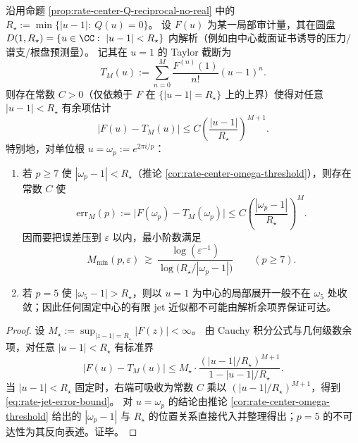 \begin{proposition}\label{prop:rate-center-Rstar-jet-complexity}
沿用命题 \ref{prop:rate-center-Q-reciprocal-no-real} 中的
\(
R_\star:=\min\{|u-1|:\ Q(u)=0\}
\)。
设 \(F(u)\) 为某一局部审计量，其在圆盘
\(
D(1,R_\star)=\{u\in\CC:\ |u-1|<R_\star\}
\)
内解析（例如由中心截面证书诱导的压力/谱支/根盘预测量）。
记其在 \(u=1\) 的 Taylor 截断为
\[
T_M(u):=\sum_{n=0}^{M}\frac{F^{(n)}(1)}{n!}(u-1)^n.
\]
则存在常数 \(C>0\)（仅依赖于 \(F\) 在 \(\{|u-1|=R_\star\}\) 上的上界）使得对任意 \(|u-1|<R_\star\) 有余项估计
\begin{equation}\label{eq:rate-jet-error-bound}
\boxed{\;
\bigl|F(u)-T_M(u)\bigr|
\le
C\left(\frac{|u-1|}{R_\star}\right)^{M+1}. \;}
\end{equation}
特别地，对单位根 \(u=\omega_p:=e^{2\pi i/p}\)：
\begin{enumerate}
  \item 若 \(p\ge 7\) 使 \(|\omega_p-1|<R_\star\)（推论 \ref{cor:rate-center-omega-threshold}），则存在常数 \(C\) 使
  \[
  \mathrm{err}_M(p):=\bigl|F(\omega_p)-T_M(\omega_p)\bigr|
  \le
  C\left(\frac{|\omega_p-1|}{R_\star}\right)^{M}.
  \]
  因而要把误差压到 \(\varepsilon\) 以内，最小阶数满足
  \[
  M_{\min}(p,\varepsilon)\ \gtrsim\ \frac{\log(\varepsilon^{-1})}{\log\!\bigl(R_\star/|\omega_p-1|\bigr)}\qquad(p\ge 7).
  \]
  \item 若 \(p=5\) 使 \(|\omega_5-1|>R_\star\)，则以 \(u=1\) 为中心的局部展开一般不在 \(\omega_5\) 处收敛；因此任何固定中心的有限 jet 近似都不可能由解析余项界保证可达。
\end{enumerate}
\end{proposition}
\begin{proof}
设 \(M_\star:=\sup_{|z-1|=R_\star}|F(z)|<\infty\)。
由 Cauchy 积分公式与几何级数余项，对任意 \(|u-1|<R_\star\) 有标准界
\[
\bigl|F(u)-T_M(u)\bigr|
\le
M_\star\cdot \frac{(|u-1|/R_\star)^{M+1}}{1-|u-1|/R_\star}.
\]
当 \(|u-1|<R_\star\) 固定时，右端可吸收为常数 \(C\) 乘以 \((|u-1|/R_\star)^{M+1}\)，得到 \eqref{eq:rate-jet-error-bound}。
对 \(u=\omega_p\) 的结论由推论 \ref{cor:rate-center-omega-threshold} 给出的 \(|\omega_p-1|\) 与 \(R_\star\) 的位置关系直接代入并整理得出；\(p=5\) 的不可达性为其反向表述。证毕。
\end{proof}
